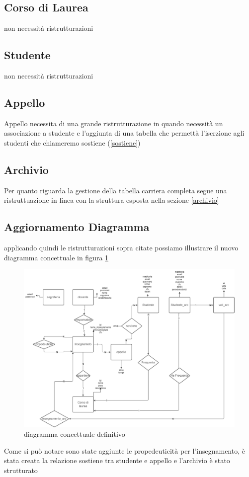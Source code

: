 \subsection{Corso di Laurea}
non necessità ristrutturazioni
\subsection{Studente}
non necessità ristrutturazioni
\subsection{Appello}
Appello necessita di una grande ristrutturazione in quando necessità un associazione a studente e l'aggiunta di una tabella che permettà l'iscrzione agli studenti che chiameremo sostiene (\ref{sostiene})
\subsection{Archivio}
Per quanto riguarda la gestione della tabella carriera completa segue una ristruttuazione in linea con la struttura esposta nella sezione \ref{archivio}

\subsection{Aggiornamento Diagramma}
applicando quindi le ristrutturazioni sopra citate possiamo illustrare il nuovo diagramma concettuale in figura \ref{fig:concettuale2}
\begin{figure}[ht]
    \centering
    \includegraphics[width=0.8\linewidth]{images/concettuale-2.png}
    \caption{diagramma concettuale definitivo}
    \label{fig:concettuale2}
\end{figure}

Come si può notare sono state aggiunte le propedeuticità per l'insegnamento, è stata creata la relazione sostiene tra studente e appello e l'archivio è stato strutturato